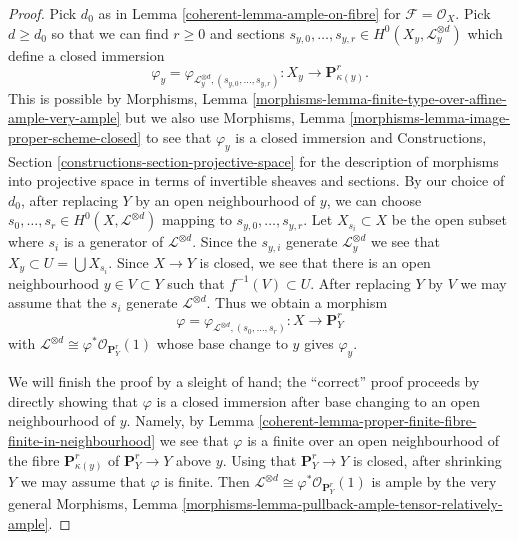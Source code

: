 \begin{proof}

Pick $d_0$ as in Lemma \ref{coherent-lemma-ample-on-fibre} for
$\mathcal{F} = \mathcal{O}_X$. Pick $d \geq d_0$
so that we can find $r \geq 0$ and sections
$s_{y, 0}, \ldots, s_{y, r} \in H^0(X_y, \mathcal{L}_y^{\otimes d})$
which define a closed immersion
$$
\varphi_y =
\varphi_{\mathcal{L}_y^{\otimes d}, (s_{y, 0}, \ldots, s_{y, r})} :
X_y \to \mathbf{P}^r_{\kappa(y)}.
$$
This is possible by Morphisms, Lemma
\ref{morphisms-lemma-finite-type-over-affine-ample-very-ample}
but we also use
Morphisms, Lemma \ref{morphisms-lemma-image-proper-scheme-closed}
to see that $\varphi_y$ is a closed immersion and
Constructions, Section \ref{constructions-section-projective-space}
for the description of morphisms into projective
space in terms of invertible sheaves and sections.
By our choice of $d_0$, after replacing $Y$ by an open neighbourhood
of $y$, we can choose
$s_0, \ldots, s_r \in H^0(X, \mathcal{L}^{\otimes d})$
mapping to $s_{y, 0}, \ldots, s_{y, r}$.
Let $X_{s_i} \subset X$ be the open subset where $s_i$
is a generator of $\mathcal{L}^{\otimes d}$. Since
the $s_{y, i}$ generate $\mathcal{L}_y^{\otimes d}$ we see that
$X_y \subset U = \bigcup X_{s_i}$.
Since $X \to Y$ is closed, we see that
there is an open neighbourhood $y \in V \subset Y$
such that $f^{-1}(V) \subset U$.
After replacing $Y$ by $V$ we may assume that
the $s_i$ generate $\mathcal{L}^{\otimes d}$. Thus we
obtain a morphism
$$
\varphi = \varphi_{\mathcal{L}^{\otimes d}, (s_0, \ldots, s_r)} :
X \longrightarrow \mathbf{P}^r_Y
$$
with $\mathcal{L}^{\otimes d} \cong \varphi^*\mathcal{O}_{\mathbf{P}^r_Y}(1)$
whose base change to $y$ gives $\varphi_y$.

\medskip\noindent
We will finish the proof by a sleight of hand; the ``correct'' proof
proceeds by directly showing that $\varphi$ is a closed
immersion after base changing to an open neighbourhood of $y$.
Namely, by Lemma \ref{coherent-lemma-proper-finite-fibre-finite-in-neighbourhood}
we see that $\varphi$ is a finite over an open neighbourhood
of the fibre $\mathbf{P}^r_{\kappa(y)}$ of $\mathbf{P}^r_Y \to Y$
above $y$. Using that $\mathbf{P}^r_Y \to Y$ is closed, after
shrinking $Y$ we may assume that $\varphi$ is finite.
Then $\mathcal{L}^{\otimes d} \cong \varphi^*\mathcal{O}_{\mathbf{P}^r_Y}(1)$
is ample by the very general
Morphisms, Lemma \ref{morphisms-lemma-pullback-ample-tensor-relatively-ample}.
\end{proof}

